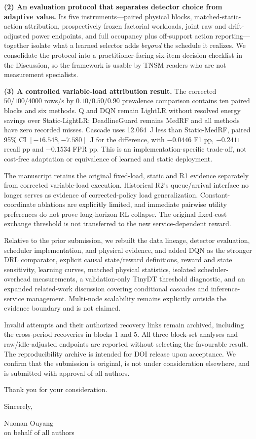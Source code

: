\documentclass[11pt]{article}
\begin{document}
\textbf{(2) An evaluation protocol that separates detector choice from adaptive value.} Its five instruments---paired physical blocks, matched-static-action attribution, prospectively frozen factorial workloads, joint raw and drift-adjusted power endpoints, and full occupancy plus off-support action reporting---together isolate what a learned selector adds \emph{beyond} the schedule it realizes. We consolidate the protocol into a practitioner-facing six-item decision checklist in the Discussion, so the framework is usable by TNSM readers who are not measurement specialists.

\textbf{(3) A controlled variable-load attribution result.} The corrected $50/100/4000$ rows/s by $0.10/0.50/0.90$ prevalence comparison contains ten paired blocks and six methods. Q and DQN remain LightLR without resolved energy savings over Static-LightLR; DeadlineGuard remains MedRF and all methods have zero recorded misses. Cascade uses 12.064~J less than Static-MedRF, paired 95\% CI $[-16.548,-7.580]$~J for the difference, with $-0.0446$ F1 pp, $-0.2411$ recall pp and $-0.1534$ FPR pp. This is an implementation-specific trade-off, not cost-free adaptation or equivalence of learned and static deployment.

The manuscript retains the original fixed-load, static and R1 evidence separately from corrected variable-load execution. Historical R2's queue/arrival interface no longer serves as evidence of corrected-policy load generalization. Constant-coordinate ablations are explicitly limited, and immediate pairwise utility preferences do not prove long-horizon RL collapse. The original fixed-cost exchange threshold is not transferred to the new service-dependent reward.

Relative to the prior submission, we rebuilt the data lineage, detector evaluation, scheduler implementation, and physical evidence, and added DQN as the stronger DRL comparator, explicit causal state/reward definitions, reward and state sensitivity, learning curves, matched physical statistics, isolated scheduler-overhead measurements, a validation-only TinyDT threshold diagnostic, and an expanded related-work discussion covering conditional cascades and inference-service management. Multi-node scalability remains explicitly outside the evidence boundary and is not claimed.

Invalid attempts and their authorized recovery links remain archived, including the cross-period recoveries in blocks 1 and 5. All three block-set analyses and raw/idle-adjusted endpoints are reported without selecting the favourable result. The reproducibility archive is intended for DOI release upon acceptance. We confirm that the submission is original, is not under consideration elsewhere, and is submitted with approval of all authors.

Thank you for your consideration.

\vspace{18pt}
Sincerely,

\vspace{34pt}
Nuonan Ouyang\\
on behalf of all authors
\end{document}
